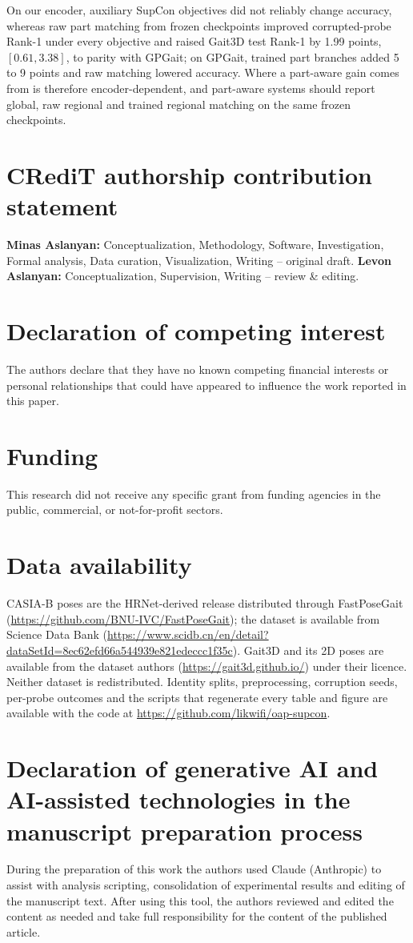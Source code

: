 \documentclass[review,12pt]{elsarticle}
\begin{document}
On our encoder, auxiliary SupCon objectives did not reliably change accuracy,
whereas raw part matching from frozen checkpoints improved corrupted-probe
Rank-1 under every objective and raised Gait3D test Rank-1 by 1.99 points,
$[0.61,3.38]$, to parity with GPGait; on GPGait, trained part branches added 5 to
9 points and raw matching lowered accuracy. Where a part-aware gain comes from
is therefore encoder-dependent, and part-aware systems should report global,
raw regional and trained regional matching on the same frozen checkpoints.

\section*{CRediT authorship contribution statement}
\textbf{Minas Aslanyan:} Conceptualization, Methodology, Software, Investigation,
Formal analysis, Data curation, Visualization, Writing -- original draft.
\textbf{Levon Aslanyan:} Conceptualization, Supervision, Writing -- review \&
editing.

\section*{Declaration of competing interest}
The authors declare that they have no known competing financial interests or
personal relationships that could have appeared to influence the work reported
in this paper.

\section*{Funding}
This research did not receive any specific grant from funding agencies in the
public, commercial, or not-for-profit sectors.

\section*{Data availability}
CASIA-B poses are the HRNet-derived release distributed through FastPoseGait
(\url{https://github.com/BNU-IVC/FastPoseGait}); the dataset is available from
Science Data Bank
(\url{https://www.scidb.cn/en/detail?dataSetId=8ec62efd66a544939e821edeccc1f35c}).
Gait3D and its 2D poses are available from the dataset authors
(\url{https://gait3d.github.io/}) under their licence. Neither dataset is
redistributed. Identity splits, preprocessing, corruption seeds, per-probe
outcomes and the scripts that regenerate every table and figure are available
with the code at \url{https://github.com/likwifi/oap-supcon}.

\section*{Declaration of generative AI and AI-assisted technologies in the manuscript preparation process}
During the preparation of this work the authors used Claude (Anthropic) to
assist with analysis scripting, consolidation of experimental results and
editing of the manuscript text. After using this tool, the authors reviewed and
edited the content as needed and take full responsibility for the content of
the published article.



\end{document}
